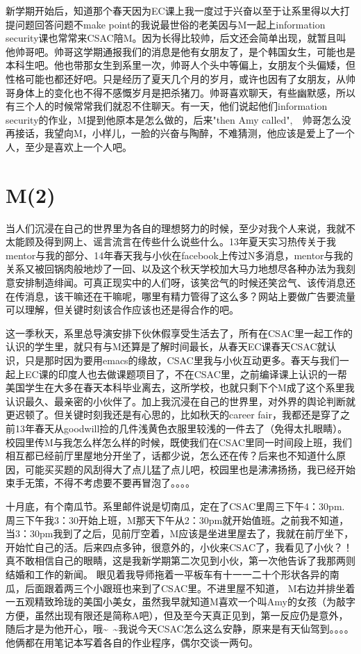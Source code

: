 \documentclass[12pt]{book}
\begin{document}
新学期开始后，知道那个春天因为EC课上我一度过于兴奋以至于让系里得以大打提问题回答问题不make point的我说最世俗的老美因与M一起上information security课也常常来CSAC陪M。因为长得比较帅，后文还会简单出现，就暂且叫他帅哥吧。帅哥这学期通报我们的消息是他有女朋友了，是个韩国女生，可能也是本科生吧。他也带那女生到系里一次，帅哥人个头中等偏上，女朋友个头偏矮，但性格可能也都还好吧。只是经历了夏天几个月的岁月，或许也因有了女朋友，从帅哥身体上的变化也不得不感慨岁月是把杀猪刀。帅哥喜欢聊天，有些幽默感，所以有三个人的时候常常我们就忍不住聊天。有一天，他们说起他们information security的作业，M提到他原本是怎么做的，后来"then Amy called",　帅哥怎么没再接话，我望向M，小样儿，一脸的兴奋与陶醉，不难猜测，他应该是爱上了一个人，至少是喜欢上一个人吧。

\section{M(2)}
\label{sec-15-2}
当人们沉浸在自己的世界里为各自的理想努力的时候，至少对我个人来说，我就不太能顾及得到网上、谣言流言在传些什么说些什么。13年夏天实习热传关于我mentor与我的部分、14年春天我与小伙在facebook上传过N多消息，mentor与我的关系又被回锅肉般地炒了一回、以及这个秋天学校加大马力地想尽各种办法为我刻意安排制造绯闻。可真正现实中的人们呀，该笑岔气的时候还笑岔气、该传消息还在传消息，该干嘛还在干嘛呢，哪里有精力管得了这么多？网站上要做广告要流量可以理解，但关键时刻该合作应该也还是得合作的吧。

这一季秋天，系里总导演安排下伙休假享受生活去了，所有在CSAC里一起工作的认识的学生里，就只有与M还算是了解时间最长，从春天EC课春天CSAC就认识，只是那时因为要用emacs的缘故，CSAC里我与小伙互动更多。春天与我们一起上EC课的印度人也去做课题项目了，不在CSAC里，之前编译课上认识的一帮美国学生在大多在春天本科毕业离去，这所学校，也就只剩下个M成了这个系里我认识最久、最亲密的小伙伴了。加上我沉浸在自己的世界里，对外界的舆论判断就更迟顿了。但关键时刻我还是有心思的，比如秋天的career fair，我都还是穿了之前13年春天从goodwill捡的几件浅黄色衣服里较浅的一件去了（免得太扎眼睛）。校园里传M与我怎么样怎么样的时候，既使我们在CSAC里同一时间段上班，我们相互都已经前厅里屋地分开坐了，话都少说，怎么还在传？后来也不知道什么原因，可能买买题的风刮得大了点儿猛了点儿吧，校园里也是沸沸扬扬，我已经开始束手无策，不得不考虑要不要再冒泡了。。。。

十月底，有个南瓜节。系里邮件说是切南瓜，定在了CSAC里周三下午4：30pm. 周三下午我3：30开始上班，M那天下午从2：30pm就开始值班。之前我不知道，当3：30pm我到了之后，见前厅空着，M应该是坐进里屋去了，我就在前厅坐下，开始忙自己的活。后来四点多钟，很意外的，小伙来CSAC了，我看见了小伙？！真不敢相信自己的眼睛，这是我新学期第二次见到小伙，第一次他告诉了我那两则结婚和工作的新闻。 眼见着我导师拖着一平板车有十一一二十个形状各异的南瓜，后面跟着两三个小跟班也来到了CSAC里。不进里屋不知道， M右边并排坐着一五观精致玲珑的美国小美女，虽然我早就知道M喜欢一个叫Amy的女孩（为敲字方便，虽然出现有限还是简称A吧），但及至今天真正见到，第一反应仍是意外，随后才是为他开心，哦\textasciitilde{}~\textasciitilde{}我说今天CSAC怎么这么安静，原来是有天仙驾到。。。。他俩都在用笔记本写着各自的作业程序，偶尔交谈一两句。
\end{document}
